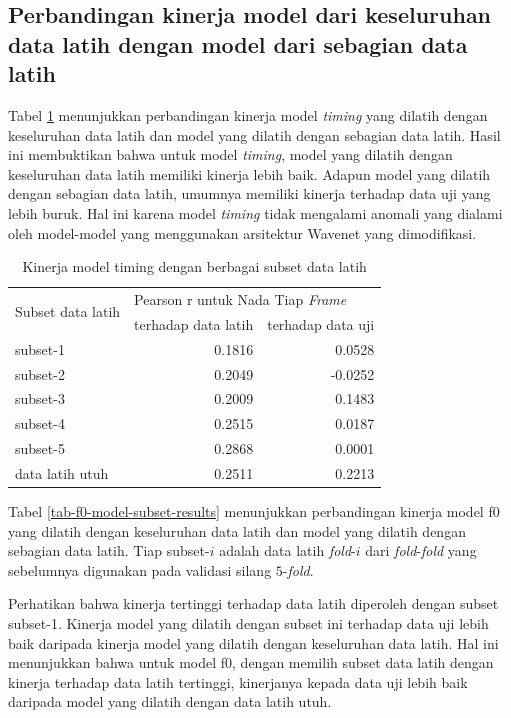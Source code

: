 \subsection{Perbandingan kinerja model dari keseluruhan data latih dengan model dari sebagian data latih}

Tabel \ref{tab-timing-model-subset-results} menunjukkan perbandingan kinerja model \textit{timing} yang dilatih dengan keseluruhan data latih dan model yang dilatih dengan sebagian data latih. Hasil ini membuktikan bahwa untuk model \textit{timing}, model yang dilatih dengan keseluruhan data latih memiliki kinerja lebih baik. Adapun model yang dilatih dengan sebagian data latih, umumnya memiliki kinerja terhadap data uji yang lebih buruk. Hal ini karena model \textit{timing} tidak mengalami anomali yang dialami oleh model-model yang menggunakan arsitektur Wavenet yang dimodifikasi.

\begin{table}[htbp]
    \centering
    \caption{Kinerja model timing dengan berbagai subset data latih}\label{tab-timing-model-subset-results}
    \begin{tabular}{ |l|r|r| } 
     \hline
     \multirow{2}{*}{Subset data latih} & \multicolumn{2}{l|}{Pearson r untuk Nada Tiap \textit{Frame}} \\
     \cline{2-3}
     & terhadap data latih & terhadap data uji \\\hline

	subset-1          &0.1816  &0.0528\\\hline
	subset-2          &0.2049 &-0.0252\\\hline
	subset-3          &0.2009  &0.1483\\\hline
	subset-4          &0.2515  &0.0187\\\hline
	subset-5          &0.2868  &0.0001\\\hline
	data latih utuh			 &0.2511  &0.2213\\\hline
    \end{tabular}
\end{table}

Tabel \ref{tab-f0-model-subset-results} menunjukkan perbandingan kinerja model f0 yang dilatih dengan keseluruhan data latih dan model yang dilatih dengan sebagian data latih. Tiap subset-$i$ adalah data latih \textit{fold}-$i$ dari \textit{fold}-\textit{fold} yang sebelumnya digunakan pada validasi silang $5$-\textit{fold}.

Perhatikan bahwa kinerja tertinggi terhadap data latih diperoleh dengan subset subset-1. Kinerja model yang dilatih dengan subset ini terhadap data uji lebih baik daripada kinerja model yang dilatih dengan keseluruhan data latih. Hal ini menunjukkan bahwa untuk model f0, dengan memilih subset data latih dengan kinerja terhadap data latih tertinggi, kinerjanya kepada data uji lebih baik daripada model yang dilatih dengan data latih utuh. 

